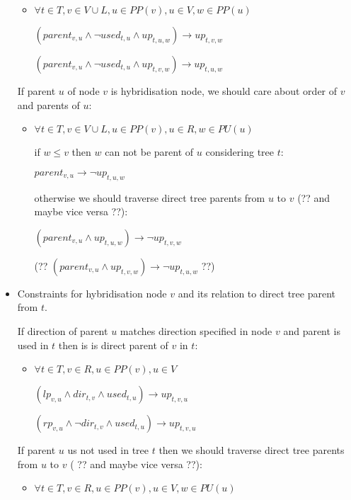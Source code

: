 \documentclass[runningheads, envcountsame, a4paper]{llncs}
\begin{document}
\begin{itemize}
	\begin{itemize}
    \item $\forall t \in T,v \in V \cup L, u \in PP(v), u \in V, w \in PP(u)$
    
	$(parent_{v,u} \wedge \neg used_{t,u} \wedge up_{t,u,w}) \rightarrow up_{t,v,w}$
    
    $(parent_{v,u} \wedge \neg used_{t,u} \wedge up_{t,v,w}) \rightarrow up_{t,u,w}$
	\end {itemize}
	
	If parent $u$ of node $v$ is hybridisation node, we should care about order of $v$ and parents of $u$:

	\begin{itemize}
    \item $\forall t \in T,v \in V \cup L, u \in PP(v), u \in R, w \in PU(u)$

	if $w \leq v$ then $w$ can not be parent of $u$ considering tree $t$:
	
	$parent_{v,u} \rightarrow \neg up_{t,u,w}$
	
	otherwise we should traverse direct tree parents from $u$ to $v$ (?? and maybe vice versa ??):
	
	$(parent_{v,u} \wedge up_{t,u,w}) \rightarrow \neg up_{t,v,w}$
	
	(?? $(parent_{v,u} \wedge up_{t,v,w}) \rightarrow \neg up_{t,u,w}$ ??)
    \end{itemize}

\item Constraints for hybridisation node $v$ and its relation to direct tree parent from $t$.

	If direction of parent $u$ matches direction specified in node $v$ and parent is used in $t$ then is is direct parent of $v$ in $t$:

    \begin{itemize}
    \item $\forall t \in T, v \in R, u \in PP(v), u \in V$
	
	$(lp_{v,u} \wedge dir_{t,v} \wedge used_{t,u}) \rightarrow up_{t,v,u}$
    
    $(rp_{v,u} \wedge \neg dir_{t,v} \wedge used_{t,u}) \rightarrow up_{t,v,u}$
	\end {itemize}
	
	If parent $u$ us not used in tree $t$ then we should traverse direct tree parents from $u$ to $v$ ( ?? and maybe vice versa ??):

    \begin{itemize}
    \item $\forall t \in T, v \in R, u \in PP(v), u \in V, w \in PU(u)$
	

\end{itemize}
\end{itemize}
\end{document}
